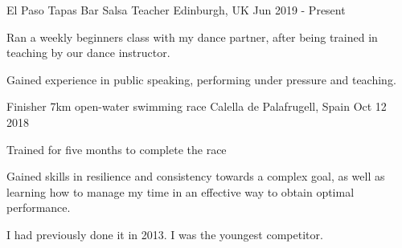 

\begin{cventries}

  \cventry
    {El Paso Tapas Bar} %
    {Salsa Teacher} %
    {Edinburgh, UK} %
    {Jun 2019 - Present} %
    {
      \begin{cvitems} %
        \item {Ran a weekly beginners class with my dance partner, after being trained in teaching by our dance instructor.}
        \item {Gained experience in public speaking, performing under pressure and teaching.}
      \end{cvitems}
    }

  \cventry
    {Finisher} %
    {7km open-water swimming race} %
    {Calella de Palafrugell, Spain} %
    {Oct 12 2018} %
    {
      \begin{cvitems} %
        \item {Trained for five months to complete the race}
        \item {Gained skills in resilience and consistency towards a complex goal, as well as learning how to manage my time in an effective way to obtain optimal performance.}
        \item{I had previously done it in 2013. I was the youngest competitor.}
      \end{cvitems}
    }

\end{cventries}
